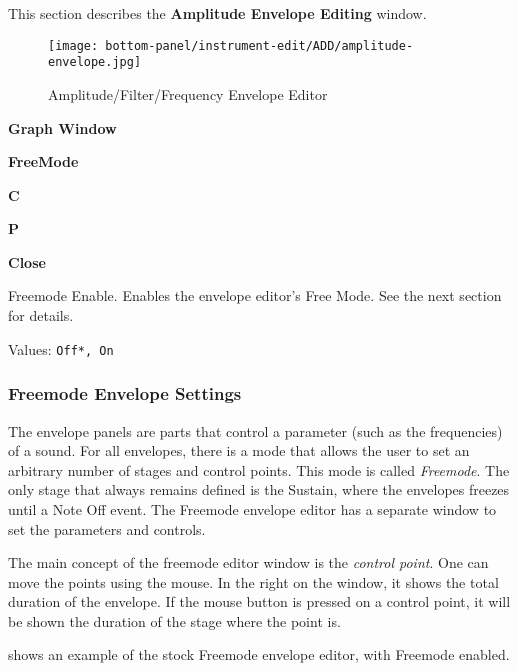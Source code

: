    This section describes the \textbf{Amplitude Envelope Editing} window.

\begin{figure}[H]
   \centering 
   \texttt{[image: bottom-panel/instrument-edit/ADD/amplitude-envelope.jpg]}
   \caption{Amplitude/Filter/Frequency Envelope Editor}
   \label{fig:amplitude_envelope_editor}
\end{figure}

   \begin{enumber}
      \item \textbf{Graph Window}
      \item \textbf{FreeMode}
      \item \textbf{C}
      \item \textbf{P}
      \item \textbf{Close}
   \end{enumber}

   \setcounter{ItemCounter}{0}      %

   Freemode Enable.
   Enables the envelope editor's Free Mode.
   See the next section for details.

   Values: \texttt{Off*, On} \\

\subsubsection{Freemode Envelope Settings}
\label{subsubsec:freemode_envelope_settings}

   The envelope panels are parts that control a parameter (such as the
   frequencies) of a sound.  For all envelopes, there is a mode that allows the
   user to set an arbitrary number of stages and control points. This mode is
   called \textsl{Freemode}.  The only stage that always remains defined is the
   Sustain, where the envelopes freezes until a Note Off event.  The Freemode
   envelope editor has a separate window to set the parameters and controls.

   The main concept of the freemode editor window is the
   \textsl{control point}.
   One can move the points using the mouse. In the right on the
   window, it shows the total duration of the envelope. If the mouse button
   is pressed on a control point, it will be shown the duration of the
   stage where the point is.

   shows an example of the stock Freemode envelope editor, with
   Freemode enabled.

